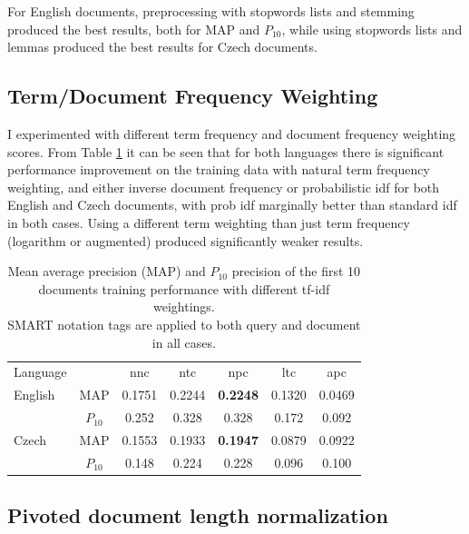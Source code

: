 \documentclass[a4paper]{article}
\begin{document}
For English documents, preprocessing with stopwords lists and stemming produced
the best results, both for MAP and $P_{10}$, while using stopwords lists and
lemmas produced the best results for Czech documents.

\subsection{Term/Document Frequency Weighting}
I experimented with different term frequency and document frequency weighting
scores. From Table \ref{tab:tfidf} it can be seen that for both languages there
is significant performance improvement on the training data with natural term
frequency weighting, and either inverse document frequency or probabilistic idf
for both English and Czech documents, with prob idf marginally better than 
standard idf in both cases. Using a different term weighting than just term
frequency (logarithm or augmented) produced significantly weaker results.

\begin{table}[htpb]
	\centering
	\caption{Mean average precision (MAP) and $P_{10}$ precision of the first
		10 documents training performance with different tf-idf weightings.\\
	SMART notation tags are applied to both query and document in all cases.\\}
	\label{tab:tfidf}
	\begin{tabular}{@{}l|cccccc@{}}
		\toprule
		Language & & nnc & ntc & npc & ltc & apc \\
		\cmidrule(r){1-1}\cmidrule(lr){2-2}\cmidrule(lr){3-3}\cmidrule(lr){4-4}\cmidrule(lr){5-5}\cmidrule(lr){6-6}\cmidrule(l){7-7}
		English & MAP & 0.1751 & 0.2244 & \textbf{0.2248} & 0.1320 & 0.0469 \\
				& \small{$P_{10}$} & \small{0.252} & \small{0.328} & \small{0.328} & \small{0.172} & \small{0.092} \\
		\cmidrule(r){1-1}\cmidrule(lr){2-2}\cmidrule(lr){3-3}\cmidrule(lr){4-4}\cmidrule(lr){5-5}\cmidrule(lr){6-6}\cmidrule(l){7-7}
		Czech & MAP & 0.1553 & 0.1933 & \textbf{0.1947} & 0.0879 & 0.0922 \\
		& \small{$P_{10}$} & \small{0.148} & \small{0.224} & \small{0.228} & \small{0.096} & \small{0.100} \\
		\bottomrule
	\end{tabular}
\end{table}

\subsection{Pivoted document length normalization}
\end{document}
